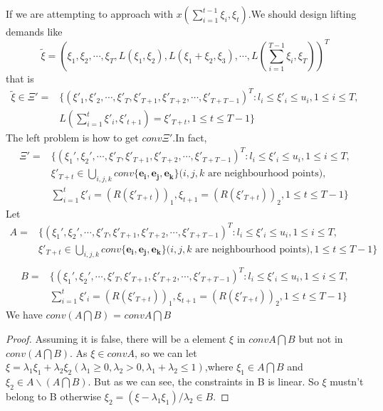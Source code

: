 \documentclass{article}
\begin{document}
If we are attempting to approach with $x(\sum\limits_{i=1}^{t-1}\xi_i,\xi_t)$.We should design lifting demands like
$$
\tilde{\xi}=(\xi_1,\xi_2,\cdots,\xi_T,L(\xi_1,\xi_2),L(\xi_1+\xi_2,\xi_3),\cdots,L(\sum\limits_{i=1}^{T-1}\xi_i,\xi_T))^T
$$
that is
$$
\begin{array}{ll}
\tilde{\xi} \in \Xi' =& \{(\xi'_1,\xi'_2,\cdots,\xi'_T,\xi'_{T+1},\xi'_{T+2},\cdots,\xi'_{T+T-1})^T:l_i\leq \xi'_i \leq u_i,1\leq i \leq T,\\
&L(\sum\limits_{i=1}^t \xi'_i,\xi'_{t+1}) = \xi'_{T+t}, 1\leq t\leq T-1\}
\end{array}
$$
The left problem is how to get $conv\Xi'$.In fact,
$$
\begin{array}{ll}
\Xi' = &\{(\xi_1',\xi_2',\cdots,\xi'_T,\xi'_{T+1},\xi'_{T+2},\cdots,\xi'_{T+T-1})^T:l_i\leq \xi'_i \leq u_i,1\leq i \leq T,\\
&\xi'_{T+t}\in \bigcup\limits_{i,j,k} conv\{\mathbf{e_i},\mathbf{e_j},\mathbf{e_k}\}\text{($i,j,k$ are neighbourhood points)},\\
& \sum\limits_{i=1}^t \xi'_i = (R(\xi'_{T+t}))_1,\xi_{t+1} = (R(\xi'_{T+t}))_2, 1\leq t\leq T-1 \}
\end{array}
$$
Let
$$
\begin{array}{ll}
A = &\{(\xi_1',\xi_2',\cdots,\xi'_T,\xi'_{T+1},\xi'_{T+2},\cdots,\xi'_{T+T-1})^T:l_i\leq \xi'_i \leq u_i,1\leq i \leq T,\\
&\xi'_{T+t}\in \bigcup\limits_{i,j,k} conv\{\mathbf{e_i},\mathbf{e_j},\mathbf{e_k}\}\text{($i,j,k$ are neighbourhood points)},1\leq t\leq T-1\}\\
\end{array}
$$
$$
\begin{array}{ll}
B = &\{(\xi_1',\xi_2',\cdots,\xi'_T,\xi'_{T+1},\xi'_{T+2},\cdots,\xi'_{T+T-1})^T:l_i\leq \xi'_i \leq u_i,1\leq i \leq T,\\
& \sum\limits_{i=1}^t \xi'_i = (R(\xi'_{T+t}))_1,\xi_{t+1} = (R(\xi'_{T+t}))_2, 1\leq t\leq T-1 \}
\end{array}
$$
We have $conv(A\bigcap B)$ = $convA \bigcap B$
\begin{proof}
Assuming it is false, there will be a element $\xi$ in $convA \bigcap B$ but not in $conv(A\bigcap B)$. As $\xi \in convA$, so we can let $\xi = \lambda_1 \xi_1+\lambda_2 \xi_2 (\lambda_1\geq0,\lambda_2> 0,\lambda_1+\lambda_2 \leq 1)$,where $\xi_1 \in A\bigcap B$  and $\xi_2 \in A\backslash(A\bigcap B)$. But as we can see, the constraints in B is linear. So $\xi$ mustn't belong to B otherwise $\xi_2 = (\xi-\lambda_1 \xi_1)/\lambda_2 \in B$.
\end{proof}
\end{document}
